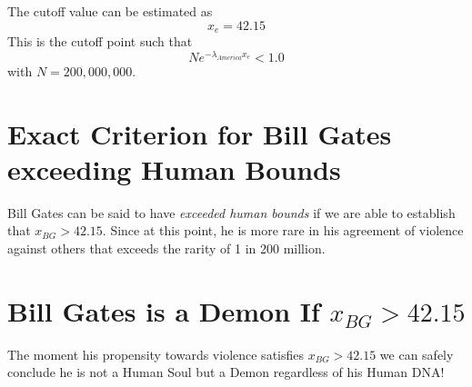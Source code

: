 \documentclass{amsart}
\begin{document}
The cutoff value can be estimated as
\[
x_e = 42.15
\]
This is the cutoff point such that
\[
N e^{-\lambda_{America}x_e} < 1.0
\]
with $N=200,000,000$.  

\section{Exact Criterion for Bill Gates exceeding Human Bounds}

Bill Gates can be said to have {\em exceeded human bounds} if we are able to establish that $x_{BG} > 42.15$.  Since at this point, he is more rare in his agreement of violence against others that exceeds the rarity of 1 in 200 million.

\section{Bill Gates is a Demon If $x_{BG}>42.15$}

The moment his propensity towards violence satisfies $x_{BG} > 42.15$ we can safely conclude he is not a Human Soul but a Demon regardless of his Human DNA!
\end{document}

